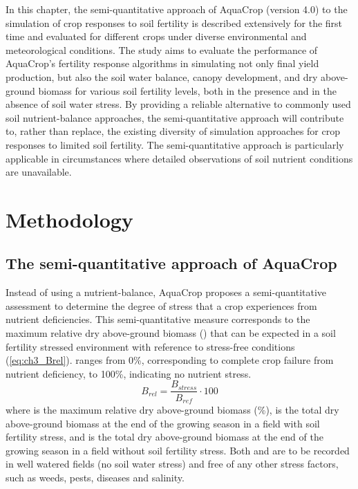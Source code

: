 In this chapter, the semi-quantitative approach of AquaCrop (version 4.0) to the simulation of crop responses to soil fertility is described extensively for the first time and evaluated for different crops under diverse environmental and meteorological conditions. The study aims to evaluate the performance of AquaCrop's fertility response algorithms in simulating not only final yield production, but also the soil water balance, canopy development, and dry above-ground biomass for various soil fertility levels, both in the presence and in the absence of soil water stress. By providing a reliable alternative to commonly used soil nutrient-balance approaches, the semi-quantitative approach will contribute to, rather than replace, the existing diversity of simulation approaches for crop responses to limited soil fertility. The semi-quantitative approach is particularly applicable in circumstances where detailed observations of soil nutrient conditions are unavailable. 

\section{Methodology}
\subsection{The semi-quantitative approach of AquaCrop}
Instead of using a nutrient-balance, AquaCrop proposes a semi-quantitative assessment to determine the degree of stress that a crop experiences from nutrient deficiencies. This semi-quantitative measure corresponds to the maximum relative dry above-ground biomass (\Brel) that can be expected in a soil fertility stressed environment with reference to stress-free conditions (\autoref{eq:ch3_Brel}). \Brel ranges from 0\%, corresponding to complete crop failure from nutrient deficiency, to 100\%, indicating no nutrient stress.
\begin{equation}
 B_{rel}=\frac{B_{stress}}{B_{ref}}\cdot 100
 \label{eq:ch3_Brel}
\end{equation}
where \Brel is the maximum relative dry above-ground biomass (\%), \Bstress is the total dry above-ground biomass at the end of the growing season in a field with soil fertility stress, and \Bref is the total dry above-ground biomass at the end of the growing season in a field without soil fertility stress. Both \Bstress and \Bref are to be recorded in well watered fields (no soil water stress) and free of any other stress factors, such as weeds, pests, diseases and salinity.

